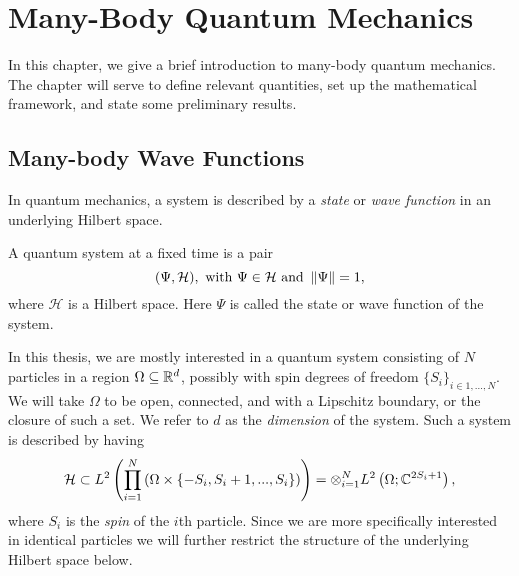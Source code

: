 
\chapter{Many-Body Quantum Mechanics} 
\label{ChapterMany-BodyQuantumMechanics}
	In this chapter, we give a brief introduction to many-body quantum mechanics. The chapter will serve to define relevant quantities, set up the mathematical framework, and state some preliminary results.

\section{Many-body Wave Functions}
	In quantum mechanics, a system is described by a \emph{state} or \emph{wave function} in an underlying Hilbert space. 
	\begin{definition}
		A quantum system at a fixed time is a pair \begin{equation*}
			(\Psi,\mathcal{H}),\text{ with } \Psi\in\mathcal{H} \text{ and } \left\lVert \Psi \right\rVert=1,
		\end{equation*}
		where $ \mathcal{H} $ is a Hilbert space. Here $ \Psi $ is called the state or wave function of the system.
	\end{definition}
	In this thesis, we are mostly interested in a quantum system consisting of $ N $ particles in a region $ \Omega\subseteq \mathbb{R}^d $, possibly with spin degrees of freedom $ \{S_i\}_{i\in{1,\ldots,N}} $. We will take $\Omega$ to be open, connected, and with a Lipschitz boundary, or the closure of such a set. We refer to $ d $ as the \emph{dimension} of the system. Such a system is described by having $$ \mathcal{H}\subset L^2\left(\prod_{i=1}^{N}\left(\Omega\times \{-S_i,S_i+1,...,S_i\}\right) \right)=\otimes_{i=1}^{N}L^2\left(\Omega;\mathbb{C}^{2S_i+1}\right), $$ where $ S_i $ is the \emph{spin} of the $ i $th particle. Since we are more specifically interested in identical particles we will further restrict the structure of the underlying Hilbert space below.

